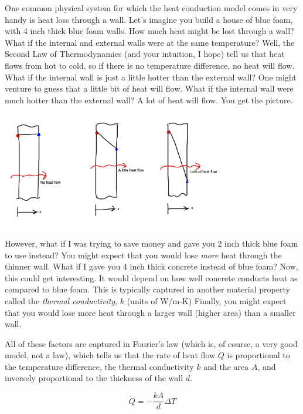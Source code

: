 One common physical system for which the heat conduction model comes in very handy is heat loss through a wall. Let's imagine you build a house of blue foam, with 4 inch thick blue foam walls. How much heat might be lost through a wall? What if the internal and external walls were at the same temperature? Well, the Second Law of Thermodynamics (and your intuition, I hope) tell us that heat flows from hot to cold, so if there is no temperature difference, no heat will flow. What if the internal wall is just a little hotter than the external wall? One might venture to guess that a little bit of heat will flow. What if the internal wall were much hotter than the external wall? A lot of heat will flow. You get the picture.

\beforefig
\centerline{\includegraphics[height=2in]{figs/wallheatflow.png}}
\afterfig

However, what if I was trying to save money and gave you 2 inch thick blue foam to use instead? You might expect that you would lose {\it more} heat through the thinner wall. What if I gave you 4 inch thick concrete instead of blue foam? Now, this could get interesting. It would depend on how well concrete conducts heat as compared to blue foam. This is typically captured in another material property called the {\it thermal conductivity}, $k$ (units of W/m-K) Finally, you might expect that you would lose more heat through a larger wall (higher area) than a smaller wall. 

All of these factors are captured in Fourier's law (which is, of course, a very good model, not a law), which tells us that the rate of heat flow $\dot{Q}$ is proportional to the temperature difference, the thermal conductivity $k$ and the area $A$, and inversely proportional to the thickness of the wall $d$.

$$\dot{Q} = -\frac{kA}{d} \Delta T $$

